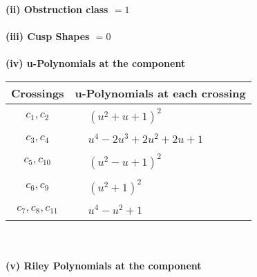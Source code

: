 \documentclass[1p]{elsarticle_modified}
\theoremstyle{definition}
\begin{document}
\flushleft \textbf{(ii) Obstruction class $= 1$}\\~\\
\flushleft \textbf{(iii) Cusp Shapes $= 0$}\\~\\
\newpage\renewcommand{\arraystretch}{1}
\flushleft \textbf{(iv) u-Polynomials at the component}\newline \\
\begin{tabular}{m{50pt}|m{274pt}}
Crossings & \hspace{64pt}u-Polynomials at each crossing \\
\hline $$\begin{aligned}c_{1},c_{2}\end{aligned}$$&$\begin{aligned}
&(u^2+u+1)^2
\end{aligned}$\\
\hline $$\begin{aligned}c_{3},c_{4}\end{aligned}$$&$\begin{aligned}
&u^4-2 u^3+2 u^2+2 u+1
\end{aligned}$\\
\hline $$\begin{aligned}c_{5},c_{10}\end{aligned}$$&$\begin{aligned}
&(u^2- u+1)^2
\end{aligned}$\\
\hline $$\begin{aligned}c_{6},c_{9}\end{aligned}$$&$\begin{aligned}
&(u^2+1)^2
\end{aligned}$\\
\hline $$\begin{aligned}c_{7},c_{8},c_{11}\end{aligned}$$&$\begin{aligned}
&u^4- u^2+1
\end{aligned}$\\
\hline
\end{tabular}\\~\\
\newpage\renewcommand{\arraystretch}{1}
\flushleft \textbf{(v) Riley Polynomials at the component}\newline \\
\end{document}
